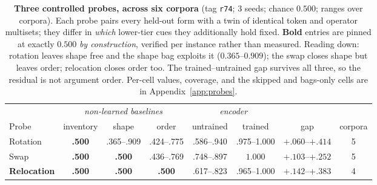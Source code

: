 \begin{table}[t]
\centering
\caption{\textbf{Three controlled probes, across six corpora} (tag \texttt{r74}; 3 seeds; chance
$0.500$; ranges over corpora). Each probe pairs every held-out form with a twin of identical token
and operator multisets; they differ in \emph{which} lower-tier cues they additionally hold fixed.
\textbf{Bold} entries are pinned at exactly $0.500$ \emph{by construction}, verified per instance
rather than measured. Reading down: rotation leaves shape free and the shape bag exploits it
($0.365$--$0.909$); the swap closes shape but leaves order; relocation closes order too. The
trained--untrained gap survives all three, so the residual is not argument order. Per-cell values,
coverage, and the skipped and bags-only cells are in Appendix~\ref{app:probes}.}
\label{tab:probes}
\small
\setlength{\tabcolsep}{4.5pt}
\begin{tabular}{l ccc cc c c}
\toprule
& \multicolumn{3}{c}{\emph{non-learned baselines}} & \multicolumn{2}{c}{\emph{encoder}} & & \\
\cmidrule(lr){2-4} \cmidrule(lr){5-6}
Probe & inventory & shape & order & untrained & trained & gap & corpora \\
\midrule
Rotation   & \textbf{.500} & .365--.909    & .424--.775    & .586--.940 & .975--1.000 & $+.060$--$+.414$ & 5 \\
Swap       & \textbf{.500} & \textbf{.500} & .436--.769    & .748--.897 & $1.000$     & $+.103$--$+.252$ & 5 \\
\textbf{Relocation} & \textbf{.500} & \textbf{.500} & \textbf{.500} & .617--.823 & .965--1.000 & $\mathbf{+.142}$--$\mathbf{+.383}$ & 4 \\
\bottomrule
\end{tabular}
\end{table}
